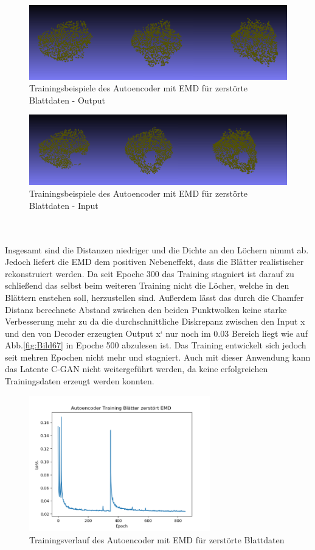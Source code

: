 \documentclass{llncs}
\begin{document}
\begin{figure}[htbp] 
	\centering
	\includegraphics[width=1.0\textwidth]{repairded_emd.png}
	\caption{Trainingsbeispiele des Autoencoder mit EMD für zerstörte Blattdaten - Output}
	\label{fig:Bild72}
\end{figure}
\begin{figure}[htbp] 
	\centering
	\includegraphics[width=1.0\textwidth]{input_emd.png}
	\caption{Trainingsbeispiele des Autoencoder mit EMD für zerstörte Blattdaten - Input}
	\label{fig:Bild69}
\end{figure}
\\\\
Insgesamt sind die Distanzen niedriger und die Dichte an den Löchern nimmt ab. Jedoch liefert die EMD dem positiven Nebeneffekt, dass die Blätter realistischer rekonstruiert werden. Da seit Epoche 300 das Training stagniert ist darauf zu schließend das selbst beim weiteren Training nicht die Löcher, welche in den Blättern enstehen soll, herzustellen sind. Außerdem lässt das durch die Chamfer Distanz berechnete Abstand zwischen den beiden Punktwolken keine starke Verbesserung mehr zu da die durchschnittliche Diskrepanz zwischen den Input x und den von Decoder erzeugten Output x` nur noch im 0.03 Bereich liegt wie auf Abb.\ref{fig:Bild67} in Epoche 500 abzulesen ist. Das Training entwickelt sich jedoch seit mehren Epochen nicht mehr und stagniert. Auch mit dieser Anwendung kann das Latente C-GAN nicht weitergeführt werden, da keine erfolgreichen Trainingsdaten erzeugt werden konnten.
\begin{figure}[htbp] 
	\centering
	\includegraphics[width=0.7\textwidth]{autoencoder_training_bleatter_zer_result_emd.png}
	\caption{Trainingsverlauf des Autoencoder mit EMD für zerstörte Blattdaten }
	\label{fig:Bild71}
\end{figure}
\end{document}
